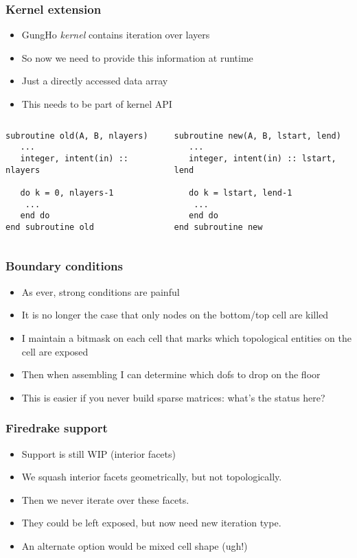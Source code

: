 \documentclass[presentation]{beamer}
\begin{document}
\begin{frame}[fragile]
  \frametitle{Kernel extension}
  \begin{itemize}
  \item GungHo \emph{kernel} contains iteration over layers
  \item So now we need to provide this information at runtime
  \item Just a directly accessed data array
  \item This needs to be part of kernel API
  \end{itemize}
  \begin{columns}
    \begin{column}{0.5\textwidth}
\begin{verbatim}
subroutine old(A, B, nlayers)
   ...
   integer, intent(in) :: nlayers

   do k = 0, nlayers-1
    ...
   end do
end subroutine old
\end{verbatim}
    \end{column}
    \begin{column}{0.5\textwidth}
\begin{verbatim}
subroutine new(A, B, lstart, lend)
   ...
   integer, intent(in) :: lstart, lend

   do k = lstart, lend-1
    ...
   end do
end subroutine new
\end{verbatim}
    \end{column}
  \end{columns}
\end{frame}

\begin{frame}
  \frametitle{Boundary conditions}
  \begin{itemize}
  \item As ever, strong conditions are painful
  \item It is no longer the case that only nodes on the bottom/top
    cell are killed
  \item I maintain a bitmask on each cell that marks which topological
    entities on the cell are exposed
  \item Then when assembling I can determine which dofs to drop on the
    floor
  \item This is easier if you never build sparse matrices: what's the
    status here?
  \end{itemize}
\end{frame}

\begin{frame}
  \frametitle{Firedrake support}
  \begin{itemize}
  \item Support is still WIP (interior facets)
  \item We squash interior facets geometrically, but not
    topologically.
  \item Then we never iterate over these facets.
  \item They could be left exposed, but now need new iteration type.
  \item An alternate option would be mixed cell shape (ugh!)
  \end{itemize}
\end{frame}
\end{document}

